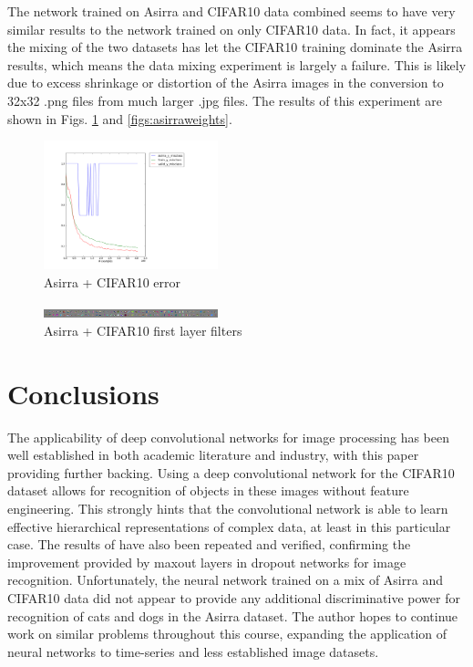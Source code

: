 \documentclass[journal]{IEEEtran}
\begin{document}
The network trained on Asirra and CIFAR10 data combined seems to have very 
similar results to the network trained on only CIFAR10 data. In fact, it 
appears the mixing of the two datasets has let the CIFAR10 training dominate
the Asirra results, which means the data mixing experiment is largely a 
failure. This is likely due to excess shrinkage or distortion of the Asirra 
images in the conversion to 32x32 .png files from much larger .jpg files.
The results of this experiment are shown in Figs. \ref{fig:asirratrain} and 
\ref{figs:asirraweights}.

\begin{figure}[h!]
\centering
  \includegraphics[width=0.45\textwidth]{asirratrain.png}
  \caption{Asirra + CIFAR10 error}
\label{fig:asirratrain}
\end{figure}

\begin{figure}[h!]
\centering
  \includegraphics[width=0.45\textwidth]{asirraweights.png}
  \caption{Asirra + CIFAR10 first layer filters}
\label{fig:asirraweights}
\end{figure}

\section{Conclusions}
The applicability of deep convolutional networks for image processing 
has been well established in both academic literature and industry, with this 
paper providing further backing. Using a deep convolutional network for the 
CIFAR10 dataset allows for recognition of objects in these images without 
feature engineering. This strongly hints that the convolutional network is able
to learn effective hierarchical representations of complex data, at least 
in this particular case. The results of \cite{Maxout} have also been repeated 
and verified, confirming the improvement provided by maxout layers in dropout
networks for image recognition. Unfortunately, the neural network trained on
a mix of Asirra and CIFAR10 data did not appear to provide any additional 
discriminative power for recognition of cats and dogs in the Asirra dataset. 
The author hopes to continue work on similar problems throughout this course, 
expanding the application of neural networks to time-series and less 
established image datasets.
\end{document}
